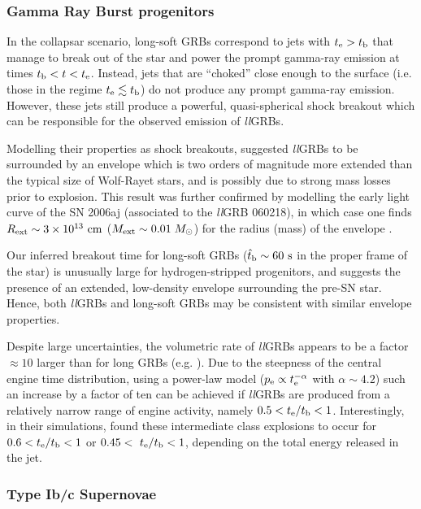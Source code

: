 \documentclass[useAMS,usenatbib]{mn2e}
\begin{document}
\subsubsection*{Gamma Ray Burst progenitors}

In the collapsar scenario, long-soft GRBs correspond to jets with $t_{\rm e}>t_{\rm b}$ that manage to break out of the star and power the prompt gamma-ray emission at times $t_{\rm b}<t<t_{\rm e}$. Instead, jets that are ``choked'' close enough to the surface (i.e. those in the regime $t_{\rm e}\lesssim t_{\rm b}$) do not produce any prompt gamma-ray emission. However, these jets still produce a powerful, quasi-spherical shock breakout which can be responsible for the observed emission of {\it ll}GRBs.

Modelling their properties as shock breakouts, \citet{NakarSari2012} suggested {\it ll}GRBs to be surrounded by an envelope which is two orders of magnitude more extended than the typical size of Wolf-Rayet stars, and is possibly due to strong mass losses prior to explosion. This result was further confirmed by modelling the early light curve of the SN 2006aj (associated to the {\it ll}GRB 060218), in which case one finds $R_{\rm ext}\sim 3\times 10^{13}\text{ cm}$ ($M_{\rm ext}\sim 0.01\;M_\odot$) for the radius (mass) of the envelope \citep{Nakar2015}.

Our inferred breakout time for long-soft GRBs ($\hat{t}_{\rm b}\sim60\text{ s}$ in the proper frame of the star) is unusually large for hydrogen-stripped progenitors, and suggests the presence of an extended, low-density envelope surrounding the pre-SN star. Hence, both {\it ll}GRBs and long-soft GRBs may be consistent with similar envelope properties.

Despite large uncertainties, the volumetric rate of {\it ll}GRBs appears to be a factor $\approx 10$ larger than for long GRBs (e.g. \citealt{Soderberg2006, GuettaDellavalle2007}). Due to the steepness of the central engine time distribution, using a power-law model ($p_{\rm e}\propto t_{\rm e}^{-\alpha}$ with $\alpha\sim 4.2$) such an increase by a factor of ten can be achieved if {\it ll}GRBs are produced from a relatively narrow range of engine activity, namely $0.5<t_{\rm e}/t_{\rm b}<1$. Interestingly, in their simulations, \citet{Lazzati2012} found these intermediate class explosions to occur for $0.6<t_{\rm e}/t_{\rm b}<1$ or $0.45<~t_{\rm e}/t_{\rm b}<1$, depending on the total energy released in the jet.


\subsubsection*{Type Ib/c Supernovae}
\end{document}

